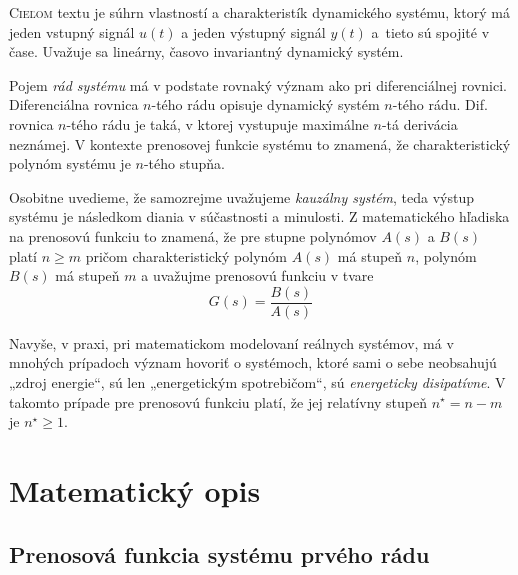 \documentclass[a4paper, 10pt, ]{article}
\begin{document}
\bigskip

\normalsize
\normalfont

\lstset{style=mystyle}










\noindent
\lettrine[lines=1, nindent=1pt, loversize=0.0]{C}{ieľom} 
textu je súhrn vlastností a charakteristík dynamického systému, ktorý má jeden vstupný signál $u(t)$ a jeden výstupný signál $y(t)$ a~tieto sú spojité v čase. Uvažuje sa lineárny, časovo invariantný dynamický systém.

Pojem \emph{rád systému} má v podstate rovnaký význam ako pri diferenciálnej rovnici. Diferenciálna rovnica $n$-tého rádu opisuje dynamický systém $n$-tého rádu. Dif. rovnica $n$-tého rádu je taká, v ktorej vystupuje maximálne $n$-tá derivácia neznámej. V kontexte prenosovej funkcie systému to znamená, že charakteristický polynóm systému je $n$-tého stupňa.

Osobitne uvedieme, že samozrejme uvažujeme \emph{kauzálny systém}, teda výstup systému je následkom diania v súčastnosti a minulosti. Z matematického hľadiska na prenosovú funkciu to znamená, že pre stupne polynómov $A(s)$ a $B(s)$ platí $n \geq m$ pričom charakteristický polynóm $A(s)$ má stupeň $n$, polynóm $B(s)$ má stupeň $m$ a uvažujme prenosovú funkciu v tvare
\begin{equation}
    G(s) = \frac{B(s)}{A(s)}
\end{equation}

Navyše, v praxi, pri matematickom modelovaní reálnych systémov, má v mnohých prípadoch význam hovoriť o systémoch, ktoré sami o sebe neobsahujú „zdroj energie“, sú len „energetickým spotrebičom“, sú \emph{energeticky disipatívne}. V takomto prípade pre prenosovú funkciu platí, že jej relatívny stupeň $n^\star = n-m$ je $n^\star \geq 1$.



\section{Matematický opis}


\subsection{Prenosová funkcia systému prvého rádu}
\end{document}
